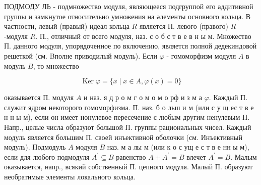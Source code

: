 \documentclass[10pt]{article}
\begin{document}
ПОДМОДУ ЛЬ - подмножество модуля, являющееся подгруппой его аддитивной группы и замкнутое относительно умножения на әлементы основного кольца. В частности, левый (правый) идеал кольца $R$ является П. левого (правого) $R$-модуля $R$. П., отличный от всего модуля, наз. с о б с т в е в н ы м. Множество П. данного модуля, упорядоченное по включению, является полной дедекиндовой решеткой (см. Bполне приводилый модуль). Если $\varphi$ - гомоморфизм модуля $A$ в модуль $B$, то множество



\[

\operatorname{Ker} \varphi=\{x \mid x \in A, \varphi(x)=0\}

\]



оказывается П. модуля $A$ и наз. я д р о м г о м о м о рф и з м а $\varphi$. Каждый П. служит ядром некоторого гомоморфизма. П. наз. б о льш и м (или с у щ ес т в е н н ы м), если он имеет нөнулевое пересечение с любым другим ненулевым П. Напр., целые числа образуют большой П. группы рациональных чисел. Каждый модуль является большим П. своей инъективной оболочки (см. Инъективный модуль). Подмодуль $A$ модуля $B$ наз. м а лы м (или к о с ущ е с т в е нн ы м), если для любого подмодуля $A^{\prime} \subseteq B$ равенство $A+A^{\prime}=B$ влечет $A^{\prime}=B$. Малым оказывается, напр., всякий собственный П. цепного модуля. Малый П. образуют необратимые элементы локального кольца.
\end{document}
